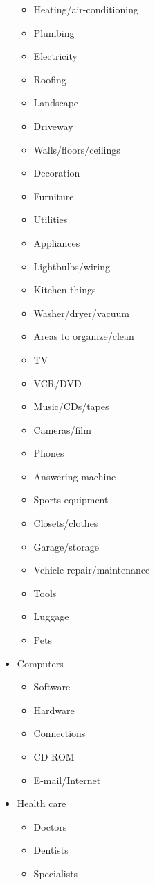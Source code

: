 \documentclass[10pt,landscape]{article}
\begin{document}
\begin{multicols}{3}
\begin{itemize}
\begin{itemize}
\item Heating/air-conditioning 
\item Plumbing 
\item Electricity 
\item Roofing 
\item Landscape 
\item Driveway 
\item Walls/floors/ceilings 
\item Decoration 
\item Furniture 
\item Utilities 
\item Appliances 
\item Lightbulbs/wiring 
\item Kitchen things 
\item Washer/dryer/vacuum 
\item Areas to organize/clean 
\item TV 
\item VCR/DVD 
\item Music/CDs/tapes 
\item Cameras/film 
\item Phones 
\item Answering machine 
\item Sports equipment 
\item Closets/clothes 
\item Garage/storage 
\item Vehicle repair/maintenance 
\item Tools 
\item Luggage 
\item Pets 

\end{itemize}

\item Computers \begin{itemize}
\item Software 
\item Hardware 
\item Connections 
\item CD-ROM 
\item E-mail/Internet 

\end{itemize}

\item Health care \begin{itemize}
\item Doctors 
\item Dentists 
\item Specialists 


\end{itemize}
\end{itemize}
\end{multicols}
\end{document}
